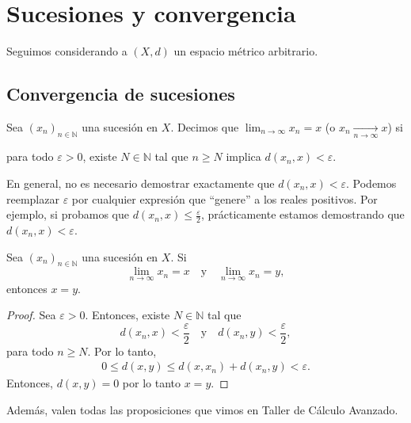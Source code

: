 \chapter{Sucesiones y convergencia}

Seguimos considerando a $(X, d)$ un espacio métrico arbitrario.

\section{Convergencia de sucesiones}

\begin{definition}
	Sea $(x_n)_{n \in \mathbb{N}}$ una sucesión en $X$. Decimos que $\lim_{n \to \infty} x_{n} = x$ (o $x_{n} \xrightarrow[n \to \infty]{} x$) si
	\begin{center}
		\begin{minipage}{0.9\linewidth}
			para todo $\varepsilon > 0$, existe $N \in \mathbb{N}$ tal que $n \geq N$ implica $d(x_n, x) < \varepsilon$.
		\end{minipage}
	\end{center}
\end{definition}

\begin{remark}
	En general, no es necesario demostrar exactamente que $d(x_n, x) < \varepsilon$. Podemos reemplazar $\varepsilon$ por cualquier expresión que ``genere'' a los reales positivos. Por ejemplo, si probamos que $d(x_n, x) \leq \frac{\varepsilon}{2}$, prácticamente estamos demostrando que $d(x_n, x) < \varepsilon$.
\end{remark}

\begin{proposition}
	Sea $(x_n)_{n \in \mathbb{N}}$ una sucesión en $X$. Si
	$$
		\lim_{n \to \infty} x_n = x \quad\text{y}\quad \lim_{n \to \infty} x_n = y,
	$$
	entonces $x = y$.
\end{proposition}


\begin{proof}
	Sea $\varepsilon > 0$. Entonces, existe $N \in \mathbb{N}$ tal que
	$$
		d(x_n, x) < \frac{\varepsilon}{2} \quad \text{y} \quad d(x_n, y) < \frac{\varepsilon}{2},
	$$
	para todo $n \geq N$. Por lo tanto,
	\begin{align*}
		0 \leq  d(x, y) \leq d(x, x_n) + d(x_n, y) < \varepsilon.
	\end{align*}
	Entonces, $d(x, y) = 0$ por lo tanto $x = y$.
\end{proof}

Además, valen todas las proposiciones que vimos en Taller de Cálculo Avanzado.

